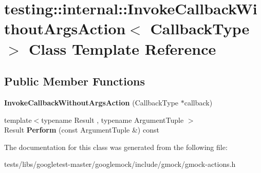 \hypertarget{classtesting_1_1internal_1_1InvokeCallbackWithoutArgsAction}{}\section{testing\+:\+:internal\+:\+:Invoke\+Callback\+Without\+Args\+Action$<$ Callback\+Type $>$ Class Template Reference}
\label{classtesting_1_1internal_1_1InvokeCallbackWithoutArgsAction}
\subsection*{Public Member Functions}
\begin{DoxyCompactItemize}
\item 
\mbox{\label{classtesting_1_1internal_1_1InvokeCallbackWithoutArgsAction_a333d0b92596759753cf78dc98ee7e270}} 
{\bfseries Invoke\+Callback\+Without\+Args\+Action} (Callback\+Type $\ast$callback)
\item 
\mbox{\label{classtesting_1_1internal_1_1InvokeCallbackWithoutArgsAction_ac43b186c6daa5f21c8377678c6a9d4ba}} 
{\footnotesize template$<$typename Result , typename Argument\+Tuple $>$ }\\Result {\bfseries Perform} (const Argument\+Tuple \&) const
\end{DoxyCompactItemize}


The documentation for this class was generated from the following file\+:\begin{DoxyCompactItemize}
\item 
tests/libs/googletest-\/master/googlemock/include/gmock/gmock-\/actions.\+h\end{DoxyCompactItemize}
